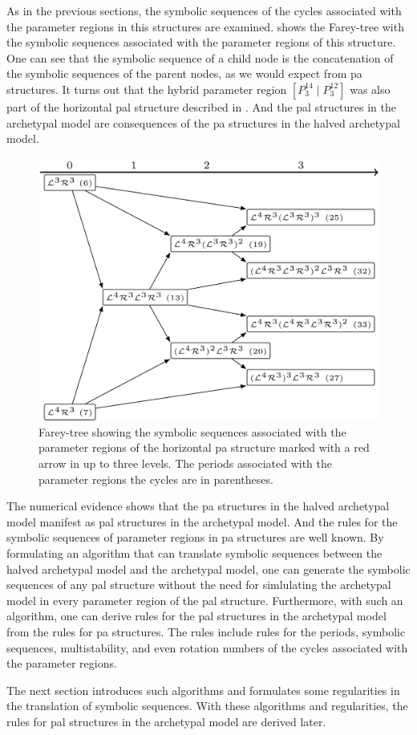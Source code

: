 As in the previous sections, the symbolic sequences of the cycles associated with the parameter regions in this structures are examined.
 shows the Farey-tree with the symbolic sequences associated with the parameter regions of this structure.
One can see that the symbolic sequence of a child node is the concatenation of the symbolic sequences of the parent nodes, as we would expect from \gls{pa} structures.
It turns out that the hybrid parameter region $\left[P^{14}_3 \mid P^{12}_3\right]$ was also part of the horizontal \gls{pal} structure described in .
And the \gls{pal} structures in the archetypal model are consequences of the \gls{pa} structures in the halved archetypal model.

\begin{figure}
	\centering
	\includegraphics[width=.7 \textwidth]{../Figures/7/7.20/adding.png}
	\caption[Farey-tree showing the symbolic sequences of a horizontal  structure]{
		Farey-tree showing the symbolic sequences associated with the parameter regions of the horizontal \gls{pa} structure marked with a red arrow in  up to three levels.
		The periods associated with the parameter regions the cycles are in parentheses.
	}
	\label{fig:halved.hor.tree}
\end{figure}

The numerical evidence shows that the \gls{pa} structures in the halved archetypal model manifest as \gls{pal} structures in the archetypal model.
And the rules for the symbolic sequences of parameter regions in \gls{pa} structures are well known.
By formulating an algorithm that can translate symbolic sequences between the halved archetypal model and the archetypal model, one can generate the symbolic sequences of any \gls{pal} structure without the need for simlulating the archetypal model in every parameter region of the \gls{pal} structure.
Furthermore, with such an algorithm, one can derive rules for the \gls{pal} structures in the archetypal model from the rules for \gls{pa} structures.
The rules include rules for the periods, symbolic sequences, multistability, and even rotation numbers of the cycles associated with the parameter regions.

The next section introduces such algorithms and formulates some regularities in the translation of symbolic sequences.
With these algorithms and regularities, the rules for \gls{pal} structures in the archetypal model are derived later.
